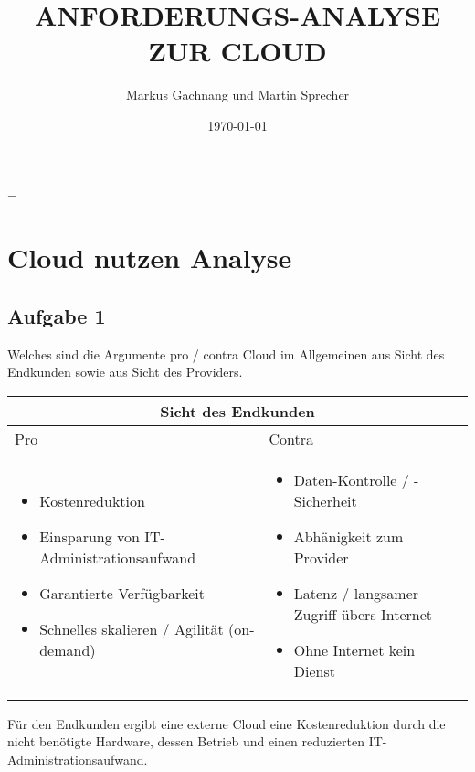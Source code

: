 \documentclass[11pt,titlepage]{article}
\title{ANFORDERUNGS-ANALYSE ZUR CLOUD}
\author{Markus Gachnang und Martin Sprecher}
\date{\today{}}
\newenvironment{shadedquotation}
 {\begin{shaded*}
  \quoting[leftmargin=0pt, vskip=0pt]
 }
 {\endquoting
 \end{shaded*}
}
\begin{document}
\sffamily
\maketitle
\newpage
\tableofcontents{}
\setcounter{page}{1}
\newpage
\RaggedRight
\emergencystretch=\maxdimen
{}
\section{Cloud nutzen Analyse}
\subsection{Aufgabe 1}
\label{sec:Aufgabe-1}

\begin{shadedquotation}
  Welches sind die Argumente pro / contra Cloud im Allgemeinen aus Sicht des Endkunden sowie aus Sicht des Providers.
\end{shadedquotation}

\par\medskip

\begin{tabular}{ |p{7cm}|p{7cm}|  }
  \hline
  \multicolumn{2}{|c|}{Sicht des Endkunden} \\
  \hline
  Pro & Contra \\
  \hline
  \begin{itemize}
    \item Kostenreduktion
    \item Einsparung von IT-Administrationsaufwand
    \item Garantierte Verfügbarkeit
    \item Schnelles skalieren / Agilität (on-demand)
  \end{itemize}
  &
  \begin{itemize}
    \item Daten-Kontrolle / -Sicherheit
    \item Abhänigkeit zum Provider
    \item Latenz / langsamer Zugriff übers Internet
    \item Ohne Internet kein Dienst
  \end{itemize}
  \\
  \hline
\end{tabular}

\par\medskip

Für den Endkunden ergibt eine externe Cloud eine Kostenreduktion durch die nicht benötigte Hardware, dessen Betrieb und einen reduzierten IT-Administrationsaufwand.
\end{document}
